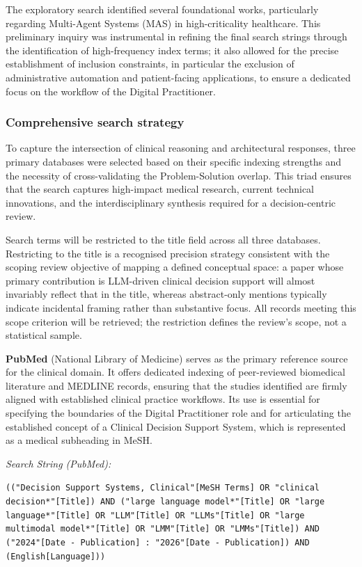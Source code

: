 \documentclass[review,12pt]{elsarticle}
\begin{document}
The exploratory search identified several foundational works, particularly regarding Multi-Agent Systems (MAS) in high-criticality healthcare.  This preliminary inquiry was instrumental in refining the final search strings through the identification of high-frequency index terms; it also allowed for the precise establishment of inclusion constraints, in particular the exclusion of administrative automation and patient-facing applications, to ensure a dedicated focus on the workflow of the Digital Practitioner.


\subsubsection{Comprehensive search strategy}

To capture the intersection of clinical reasoning and architectural responses, three primary databases were selected based on their specific indexing strengths and the necessity of cross-validating the Problem-Solution overlap.  This triad ensures that the search captures high-impact medical research, current technical innovations, and the interdisciplinary synthesis required for a decision-centric review.

 Search terms will be restricted to the title field across all three databases. Restricting to the title is a recognised precision strategy consistent with the scoping review objective of mapping a defined conceptual space: a paper whose primary contribution is LLM-driven clinical decision support will almost invariably reflect that in the title, whereas abstract-only mentions typically indicate incidental framing rather than substantive focus. All records meeting this scope criterion will be retrieved; the restriction defines the review's scope, not a statistical sample.

\textbf{PubMed} (National Library of Medicine) serves as the primary reference source for the clinical domain. It offers dedicated indexing of peer-reviewed biomedical literature and MEDLINE records, ensuring that the studies identified are firmly aligned with established clinical practice workflows. Its use is essential for specifying the boundaries of the Digital Practitioner role and for articulating the established concept of a Clinical Decision Support System, which is represented as a medical subheading in MeSH.

\textit{Search String (PubMed):}
\begin{center}
\texttt{(("Decision Support Systems, Clinical"[MeSH Terms] OR "clinical decision*"[Title]) AND ("large language model*"[Title] OR "large language*"[Title] OR "LLM"[Title] OR "LLMs"[Title] OR "large multimodal model*"[Title] OR "LMM"[Title] OR "LMMs"[Title]) AND ("2024"[Date - Publication] : "2026"[Date - Publication]) AND (English[Language]))}
\end{center}
\end{document}
